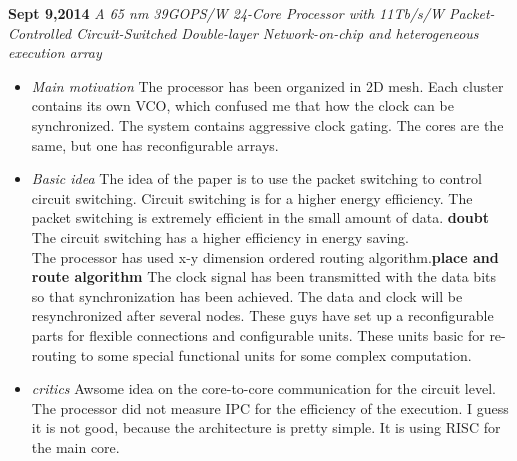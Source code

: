 \documentclass[]{article}
\begin{document}
\noindent \textbf{Sept 9,2014}
\textit{A 65 nm 39GOPS/W 24-Core Processor with 11Tb/s/W Packet-Controlled Circuit-Switched Double-layer Network-on-chip and heterogeneous execution array}
\indent		\begin{itemize}
            \item \textit{Main motivation} The processor has been organized in 2D mesh.
            Each cluster contains its own VCO, which confused me that how the clock can be synchronized.
            The system contains aggressive clock gating. The cores are the same, but one has reconfigurable arrays.

            \item \textit{Basic idea} The idea of the paper is to use the packet switching to control circuit switching.
            Circuit switching is for a higher energy efficiency.
            The packet switching is extremely efficient in the small amount of data. \textbf{doubt}
            The circuit switching has a higher efficiency in energy saving.\\

            The processor has used x-y dimension ordered routing algorithm.\textbf{place and route algorithm}
            The clock signal has been transmitted with the data bits so that synchronization has been achieved.
            The data and clock will be resynchronized after several nodes.
            These guys have set up a reconfigurable parts for flexible connections and configurable units.
            These units basic for re-routing to some special functional units for some complex computation.

            \item \textit{critics} Awsome idea on the core-to-core communication for the circuit level.
            The processor did not measure IPC for the efficiency of the execution.
            I guess it is not good, because the architecture is pretty simple.
            It is using RISC for the main core.

            \end{itemize}
\end{document}
